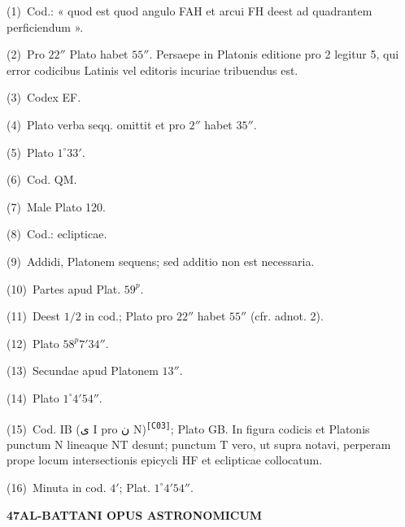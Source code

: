 \documentclass[10pt]{article}
\newcommand{\A}[1]{\hypertarget{#1}{}}
\newcommand{\NN}[2]{\par\noindent\textup{(#1)}\ #2}
\newcommand{\AR}[1]{\textarabic{#1}}
\newcommand{\U}[1]{\textsuperscript{\texttt{[#1]}}}
\newcommand{\SP}[3]{%
  \clearpage
  \A{AB01-PDF#1}%
  \begin{center}\textbf{#2\quad #3}\end{center}%
}
\begin{document}
\begin{multicols}{2}
\footnotesize

\A{AB01-PDF0135-N01}
\NN{1}{Cod.: « quod est quod angulo FAH et arcui FH deest
ad quadrantem perficiendum ».}

\A{AB01-PDF0135-N02}
\NN{2}{Pro $22''$ Plato habet $55''$. Persaepe in Platonis
editione pro 2 legitur 5, qui error codicibus Latinis vel
editoris incuriae tribuendus est.}

\A{AB01-PDF0135-N03}
\NN{3}{Codex EF.}

\A{AB01-PDF0135-N04}
\NN{4}{Plato verba seqq. omittit et pro $2''$ habet $35''$.}

\A{AB01-PDF0135-N05}
\NN{5}{Plato $1^\circ33'$.}

\A{AB01-PDF0135-N06}
\NN{6}{Cod. QM.}

\A{AB01-PDF0135-N07}
\NN{7}{Male Plato 120.}

\A{AB01-PDF0135-N08}
\NN{8}{Cod.: eclipticae.}

\A{AB01-PDF0135-N09}
\NN{9}{Addidi, Platonem sequens; sed additio non est necessaria.}

\A{AB01-PDF0135-N10}
\NN{10}{Partes apud Plat. $59^{p}$.}

\A{AB01-PDF0135-N11}
\NN{11}{Deest $1/2$ in cod.; Plato pro $22''$ habet $55''$
(cfr. adnot. 2).}

\A{AB01-PDF0135-N12}
\NN{12}{Plato $58^{p}7'34''$.}

\A{AB01-PDF0135-N13}
\NN{13}{Secundae apud Platonem $13''$.}

\A{AB01-PDF0135-N14}
\NN{14}{Plato $1^\circ4'54''$.}

\A{AB01-PDF0135-N15}
\NN{15}{Cod. IB (\AR{ى} I pro \AR{ن} N)\U{C03}; Plato GB.
In figura codicis et Platonis punctum N lineaque NT desunt;
punctum T vero, ut supra notavi, perperam prope locum
intersectionis epicycli HF et eclipticae collocatum.}

\A{AB01-PDF0135-N16}
\NN{16}{Minuta in cod. $4'$; Plat. $1^\circ4'54''$.}

\end{multicols}


\SP{0136}{47}{AL-BATTANI OPUS ASTRONOMICUM}
\end{document}
